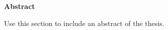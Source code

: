 \begin{center}
    {\Large\bfseries\sffamily Abstract}
\end{center}

Use this section to include an abstract of the thesis.

\newpage